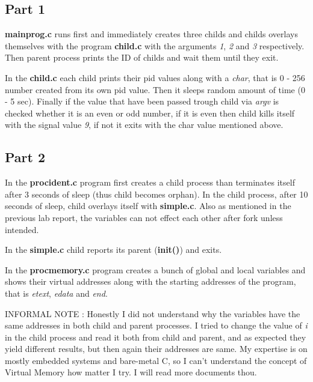 \documentclass[11pt]{article}
\begin{document}
\subsection*{Part 1}

\textbf{mainprog.c} runs first and immediately creates three childs and childs overlays themselves with the program \textbf{child.c} with the arguments \textit{1}, \textit{2} and \textit{3} respectively. Then parent process prints the ID of childs and wait them until they exit.

In the \textbf{child.c} each child prints their pid values along with a \textit{char}, that is 0 - 256 number created from its own pid value. Then it sleeps random amount of time (0 - 5 sec). Finally if the value that have been passed trough child via \textit{argv} is checked whether it is an even or odd number, if it is even then child kills itself with the signal value \textit{9}, if not it exits with the char value mentioned above.

\subsection*{Part 2}

In the \textbf{procident.c} program first creates a child process than terminates itself after 3 seconds of sleep (thus child becomes orphan). In the child process, after 10 seconds of sleep, child overlays itself with \textbf{simple.c}.  Also as mentioned in the previous lab report, the variables can not effect each other after fork unless intended. 

In the \textbf{simple.c} child reports its parent (\textbf{init()}) and exits.

In the \textbf{procmemory.c} program creates a bunch of global and local variables and shows their virtual addresses along with the starting addresses of the program, that is \textit{etext}, \textit{edata} and \textit{end}. 

INFORMAL NOTE : Honestly I did not understand why the variables have the same addresses in both child and parent processes. I tried to change the value of \textit{i} in the child process and read it both from child and parent, and as expected they yield different results, but then again their addresses are same. My expertise is on mostly embedded systems and bare-metal C, so I can't understand the concept of Virtual Memory how matter I try. I will read more documents thou.
\end{document}
